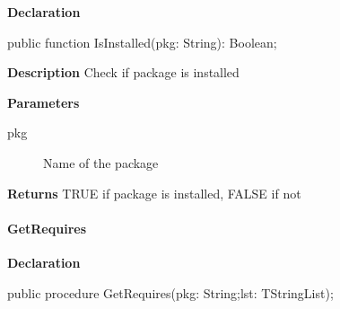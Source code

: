 \documentclass{report}
\newif\ifpdf
\begin{document}
\label{packagekit.TPackageKit-IsInstalled}
\begin{list}{}{
\setlength{\itemindent}{0cm}
\setlength{\listparindent}{0cm}
\setlength{\leftmargin}{\evensidemargin}
\addtolength{\leftmargin}{\tmplength}
\settowidth{\labelsep}{X}
\addtolength{\leftmargin}{\labelsep}
\setlength{\labelwidth}{\tmplength}
}
\item[\textbf{Declaration}\hfill]
\ifpdf
\begin{flushleft}
\fi
\begin{ttfamily}
public function IsInstalled(pkg: String): Boolean;\end{ttfamily}

\ifpdf
\end{flushleft}
\fi

\par
\item[\textbf{Description}]
Check if package is installed  \par
\item[\textbf{Parameters}]
\begin{description}
\item[pkg] Name of the package
\end{description}
\item[\textbf{Returns}]TRUE if package is installed, FALSE if not


\end{list}
\paragraph*{GetRequires}\hspace*{\fill}

\label{packagekit.TPackageKit-GetRequires}
\begin{list}{}{
\setlength{\itemindent}{0cm}
\setlength{\listparindent}{0cm}
\setlength{\leftmargin}{\evensidemargin}
\addtolength{\leftmargin}{\tmplength}
\settowidth{\labelsep}{X}
\addtolength{\leftmargin}{\labelsep}
\setlength{\labelwidth}{\tmplength}
}
\item[\textbf{Declaration}\hfill]
\ifpdf
\begin{flushleft}
\fi
\begin{ttfamily}
public procedure GetRequires(pkg: String;lst: TStringList);\end{ttfamily}

\ifpdf
\end{flushleft}
\fi

\end{list}
\end{document}
